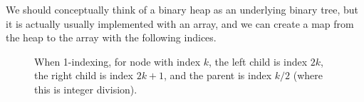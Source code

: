   We should conceptually think of a binary heap as an underlying binary tree, but it is actually usually implemented with an array, and we can create a map from the heap to the array with the following indices. 

  \begin{figure}[H]
    \centering 
    \caption{When 1-indexing, for node with index $k$, the left child is index $2k$, the right child is index $2k + 1$, and the parent is index $k/2$ (where this is integer division). } 
    \label{fig:binary_heap_array}
  \end{figure}

